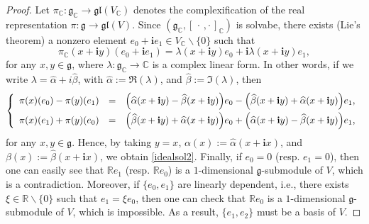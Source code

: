 \documentclass[final,1p,times,nopreprintline]{elsarticle}
\theoremstyle{definition}
\numberwithin{equation}{section}
\newcommand{\rel}{\mathbb{R}}
\newcommand{\cplx}{\mathbb{C}}
\newcommand{\g}{\mathfrak{g}}
\numberwithin{equation}{section}
\newcommand{\gl}{\mathfrak{gl}}
\newcommand{\cro}{[\,\cdot\,,\cdot\,]}
\begin{document}
\begin{proof}
	Let $\pi_\cplx:\g_\cplx\to\gl(V_\cplx)$ denotes the complexification of the real representation $\pi:\g\to\gl(V)$. Since $(\g_\cplx,\cro_\cplx)$ is solvabe, there exists (Lie's theorem) a nonzero element $e_0+\mathbf{i}e_1\in V_\cplx\backslash\{0\}$  such that 
	\begin{equation*}
		\pi_\cplx(x+\mathbf{i}y)(e_0+\mathbf{i}e_1)=\lambda(x+\mathbf{i}y)e_0+\mathbf{i}\lambda(x+\mathbf{i}y)e_1,
	\end{equation*}
	for any $x,y\in\g$, where $\lambda:\g_\cplx\to\cplx$ is a complex linear form. In other words, if we write $\lambda=\widehat{\alpha}+i\widehat{\beta}$, with $\widehat{\alpha}:=\Re(\lambda)$, and $\widehat{\beta}:=\Im(\lambda)$, then 
	\begin{equation*}
		\left\{
		\begin{array}{r c l}\vspace{1mm}
			\pi(x)(e_0)-\pi(y)(e_1)&=&\Big(\widehat{\alpha}(x+\mathbf{i}y)-\widehat{\beta}(x+\mathbf{i}y)\Big)e_0-\Big(\widehat{\beta}(x+\mathbf{i}y)+\widehat{\alpha}(x+\mathbf{i}y)\Big)e_1,\\ 
			\pi(x)(e_1)+\pi(y)(e_0)&=&\Big(\widehat{\beta}(x+\mathbf{i}y)+\widehat{\alpha}(x+\mathbf{i}y)\Big)e_0+\Big(\widehat{\alpha}(x+\mathbf{i}y)-\widehat{\beta}(x+\mathbf{i}y)\Big)e_1,
		\end{array}
		\right.\\
	\end{equation*}
	for any $x,y\in\g$. Hence, by taking $y=x$, $\alpha(x):=\widehat{\alpha}(x+\mathbf{i}x)$, and $\beta(x):=\widehat{\beta}(x+\mathbf{i}x)$, we obtain \eqref{idealsol2}. Finally, if $e_0=0$ (resp. $e_1=0$), then one can easily see that $\rel e_1$ (resp. $\rel e_0$) is a $1$-dimensional $\g$-submodule of $V$, which is a contradiction. Moreover, if $\{e_0,e_1\}$ are linearly dependent, i.e., there exists $\xi\in\rel\backslash\{0\}$ such that $e_1=\xi e_0$, then one can check that $\rel e_0$ is a $1$-dimensional $\g$-submodule of $V$, which is impossible. As a result, $\{e_1,e_2\}$ must be a basis of $V$.
\end{proof}
\end{document}
